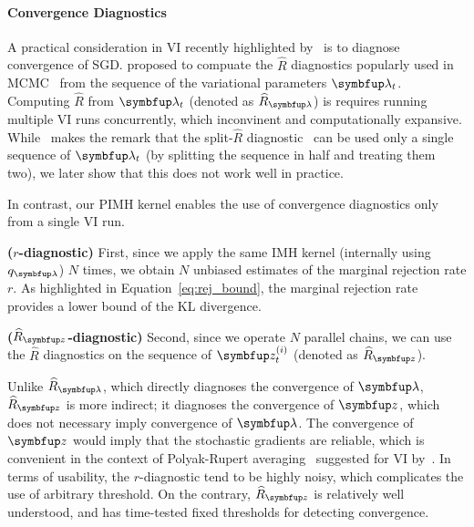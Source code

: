 \paragraph{Convergence Diagnostics}
A practical consideration in VI recently highlighted by~\citet{NEURIPS2020_7cac11e2} is to diagnose convergence of SGD.
\citeauthor{NEURIPS2020_7cac11e2} proposed to compuate the \(\widehat{R}\) diagnostics popularly used in MCMC~\citep{gelman_inference_1992, vehtari_ranknormalization_2020} from the sequence of the variational parameters \(\vlambda_t\).
Computing \(\widehat{R}\) from \(\vlambda_t\) (denoted as \(\widehat{R}_{\vlambda}\)) is requires running multiple VI runs concurrently, which inconvinent and computationally expansive.
While~\citeauthor{NEURIPS2020_7cac11e2} makes the remark that the split-\(\widehat{R}\) diagnostic~\citep{gelman_bayesian_2014} can be used only a single sequence of \(\vlambda_t\) (by splitting the sequence in half and treating them two), we later show that this does not work well in practice.

In contrast, our PIMH kernel enables the use of convergence diagnostics only from a single VI run.
\begin{enumerate*}[label=\textbf{(\roman*)}]
  \item \textbf{(\(r\)-diagnostic)} First, since we apply the same IMH kernel (internally using \(q_{\vlambda}\)) \(N\) times, we obtain \(N\) unbiased estimates of the marginal rejection rate \(r\).
    As highlighted in Equation~\eqref{eq:rej_bound}, the marginal rejection rate provides a lower bound of the KL divergence.
  \item \textbf{(\(\widehat{R}_{\vz}\)-diagnostic)} Second, since we operate \(N\) parallel chains, we can use the \(\widehat{R}\) diagnostics on the sequence of \(\vz_t^{(i)}\) (denoted as \(\widehat{R}_{\vz}\)).
\end{enumerate*}
Unlike \(\widehat{R}_{\vlambda}\), which directly diagnoses the convergence of \(\vlambda\), \(\widehat{R}_{\vz}\) is more indirect; it diagnoses the convergence of \(\vz\), which does not necessary imply convergence of \(\vlambda\).
The convergence of \(\vz\) would imply that the stochastic gradients are reliable, which is convenient in the context of Polyak-Rupert averaging~\citep{ruppert_efficient_1988, polyak_acceleration_1992} suggested for VI by~\citet{NEURIPS2020_7cac11e2}.
In terms of usability, the \(r\)-diagnostic tend to be highly noisy, which complicates the use of arbitrary threshold.
On the contrary, \(\widehat{R}_{\vz}\) is relatively well understood, and has time-tested fixed thresholds for detecting convergence.

